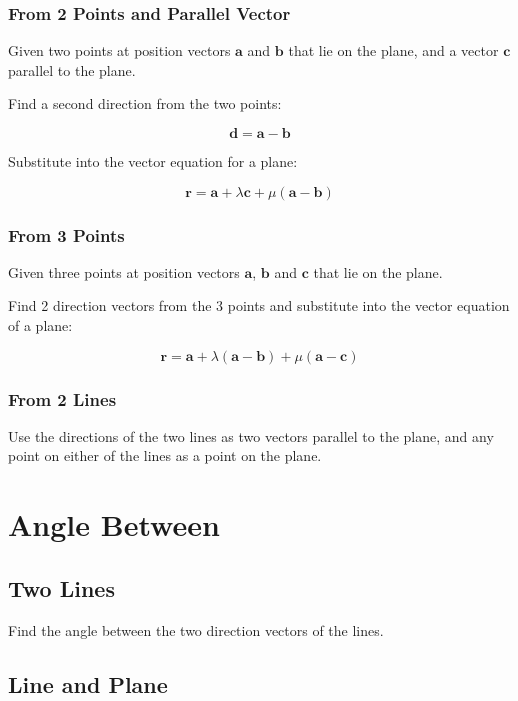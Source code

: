 \documentclass[a4paper,11pt]{article}
\newcommand{\bb}{\boldsymbol}
\begin{document}
\subsubsection{From 2 Points and Parallel Vector}

Given two points at position vectors $\bb{a}$ and $\bb{b}$ that lie on the
plane, and a vector $\bb{c}$ parallel to the plane.

Find a second direction from the two points:

$$
\bb{d} = \bb{a} - \bb{b}
$$

Substitute into the vector equation for a plane:

$$
\bb{r} = \bb{a} + \lambda \bb{c} + \mu (\bb{a} - \bb{b})
$$


\subsubsection{From 3 Points}

Given three points at position vectors $\bb{a}$, $\bb{b}$ and $\bb{c}$ that lie
on the plane.

Find 2 direction vectors from the 3 points and substitute into the vector
equation of a plane:

$$
\bb{r} = \bb{a} + \lambda (\bb{a} - \bb{b}) + \mu (\bb{a} - \bb{c})
$$


\subsubsection{From 2 Lines}

Use the directions of the two lines as two vectors parallel to the plane, and
any point on either of the lines as a point on the plane.



\section{Angle Between}

\subsection{Two Lines}

Find the angle between the two direction vectors of the lines.


\subsection{Line and Plane}
\end{document}
